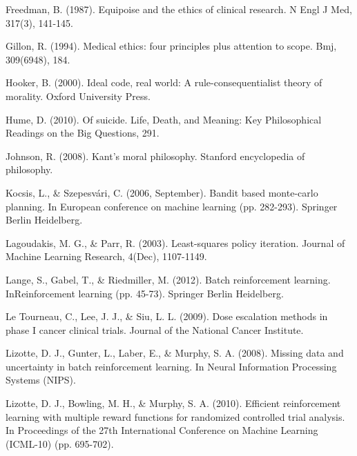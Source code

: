 \documentclass[]{spie}  %
\begin{document}
\skiplinehalf

\noindent [10] Freedman, B. (1987). Equipoise and the ethics of clinical research. N Engl J Med, 317(3), 141-145.

\skiplinehalf

\noindent [11] Gillon, R. (1994). Medical ethics: four principles plus attention to scope. Bmj, 309(6948), 184.

\skiplinehalf

\noindent [12] Hooker, B. (2000). Ideal code, real world: A rule-consequentialist theory of morality. Oxford University Press.

\skiplinehalf

\noindent [13] Hume, D. (2010). Of suicide. Life, Death, and Meaning: Key Philosophical Readings on the Big Questions, 291.

\skiplinehalf

\noindent [14] Johnson, R. (2008). Kant's moral philosophy. Stanford encyclopedia of philosophy.

\skiplinehalf

\noindent [15] Kocsis, L., & Szepesvári, C. (2006, September). Bandit based monte-carlo planning. In European conference on machine learning (pp. 282-293). Springer Berlin Heidelberg.

\skiplinehalf

\noindent [16] Lagoudakis, M. G., & Parr, R. (2003). Least-squares policy iteration. Journal of Machine Learning Research, 4(Dec), 1107-1149.

\skiplinehalf

\noindent [17] Lange, S., Gabel, T., & Riedmiller, M. (2012). Batch reinforcement learning. InReinforcement learning (pp. 45-73). Springer Berlin Heidelberg.

\skiplinehalf

\noindent [18] Le Tourneau, C., Lee, J. J., & Siu, L. L. (2009). Dose escalation methods in phase I cancer clinical trials. Journal of the National Cancer Institute.

\skiplinehalf

\noindent [19] Lizotte, D. J., Gunter, L., Laber, E., & Murphy, S. A. (2008). Missing data and uncertainty in batch reinforcement learning. In Neural Information Processing Systems (NIPS).

\skiplinehalf

\noindent [20] Lizotte, D. J., Bowling, M. H., & Murphy, S. A. (2010). Efficient reinforcement learning with multiple reward functions for randomized controlled trial analysis. In Proceedings of the 27th International Conference on Machine Learning (ICML-10) (pp. 695-702).
\end{document}
